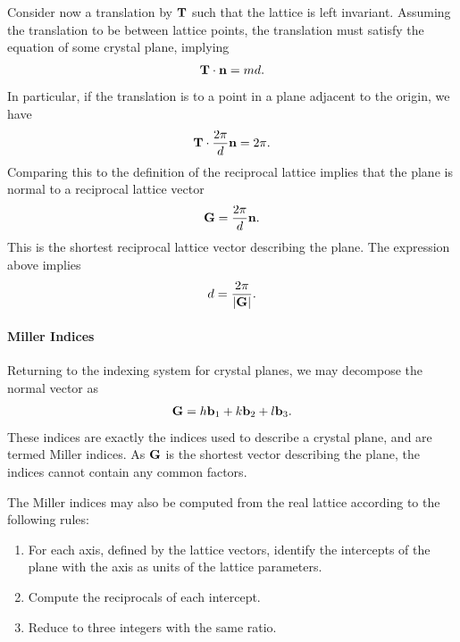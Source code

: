 Consider now a translation by $\vb{T}$ such that the lattice is left invariant. Assuming the translation to be between lattice points, the translation must satisfy the equation of some crystal plane, implying
\begin{align*}
	\vb{T}\cdot\vb{n} = md.
\end{align*}
In particular, if the translation is to a point in a plane adjacent to the origin, we have
\begin{align*}
	\vb{T}\cdot\frac{2\pi}{d}\vb{n} = 2\pi.
\end{align*}
Comparing this to the definition of the reciprocal lattice implies that the plane is normal to a reciprocal lattice vector
\begin{align*}
	\vb{G} = \frac{2\pi}{d}\vb{n}.
\end{align*}
This is the shortest reciprocal lattice vector describing the plane. The expression above implies
\begin{align*}
	d = \frac{2\pi}{\abs{\vb{G}}}.
\end{align*}

\paragraph{Miller Indices}
Returning to the indexing system for crystal planes, we may decompose the normal vector as
\begin{align*}
	\vb{G} = h\vb{b}_{1} + k\vb{b}_{2} + l\vb{b}_{3}.
\end{align*}
These indices are exactly the indices used to describe a crystal plane, and are termed Miller indices. As $\vb{G}$ is the shortest vector describing the plane, the indices cannot contain any common factors.

The Miller indices may also be computed from the real lattice according to the following rules:
\begin{enumerate}
	\item For each axis, defined by the lattice vectors, identify the intercepts of the plane with the axis as units of the lattice parameters.
	\item Compute the reciprocals of each intercept.
	\item Reduce to three integers with the same ratio.
\end{enumerate}

